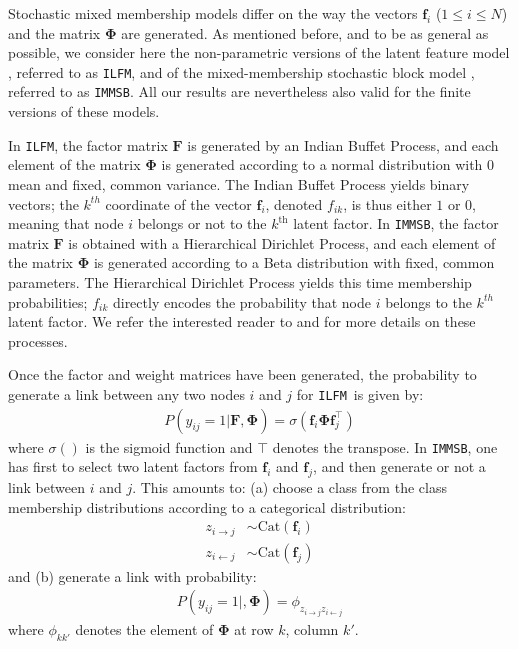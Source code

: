 \documentclass{llncs}
\newcommand{\ifm}{\texttt{ILFM}}
\newcommand{\imb}{\texttt{IMMSB}}
\newcommand{\mat}[1]{\mathbf{#1}}
\begin{document}
Stochastic mixed membership models differ on the way the vectors $\mat{f}_{i}$ ($1 \le i \le N$) and the matrix $\mat{\Phi}$ are generated. As mentioned before, and to be as general as possible, we consider here the non-parametric versions of the latent feature model \cite{ILFRM}, referred to as \ifm, and of the mixed-membership stochastic block model \cite{iMMSB,diMMSB}, referred to as \imb. All our results are nevertheless also valid for the finite versions of these models.

In \ifm, the factor matrix $\mat{F}$ is generated by an Indian Buffet Process, and each element of the matrix $\mat{\Phi}$ is generated according to a normal distribution with 0 mean and fixed, common variance. The Indian Buffet Process yields binary vectors; the $k^{th}$ coordinate of the vector $\mat{f}_{i}$, denoted $f_{ik}$, is thus either $1$ or $0$, meaning that node $i$ belongs or not to the $k^{\mbox{th}}$ latent factor. In \imb, the factor matrix $\mat{F}$ is obtained with a Hierarchical  Dirichlet Process, and each element of the matrix $\mat{\Phi}$ is generated according to a Beta distribution with fixed, common parameters. The Hierarchical  Dirichlet Process yields this time membership probabilities; $f_{ik}$ directly encodes the probability that node $i$ belongs to the $k^{th}$ latent factor. We refer the interested reader to \cite{ILFRM} and \cite{iMMSB} for more details on these processes.

Once the factor and weight matrices have been generated, the probability to generate a link between any two nodes $i$ and $j$ for \ifm\ is given by:
%
\begin{align}
P(y_{ij}=1|\mat{F},\mat{\Phi}) = \sigma(\mat{f}_{i} \mat{\Phi} \mat{f}_{j}^\top)
\label{eq:ilfm}
\end{align}
%
where $\sigma()$ is the sigmoid function and $\top$ denotes the transpose. In \imb, one has first to select two latent factors from $\mat{f}_i$ and $\mat{f}_j$, and then generate or not a link between $i$ and $j$. This amounts to: (a) choose a class from the class membership distributions according to a categorical distribution:
%
\begin{align}
 z_{i \rightarrow j} &\sim \mbox{Cat}(\mat{f}_i) \nonumber \\
 z_{i \leftarrow j} &\sim \mbox{Cat}(\mat{f}_j) \nonumber
\end{align} 
%
and (b) generate a link with probability:
%
\begin{align}
 P(y_{ij}=1|,\mat{\Phi}) = \phi_{z_{i \rightarrow j}z_{i \leftarrow j}}
\label{eq:immsb}
\end{align}
%
where $\phi_{kk'}$ denotes the element of $\mat{\Phi}$ at row $k$, column $k'$.
\end{document}
